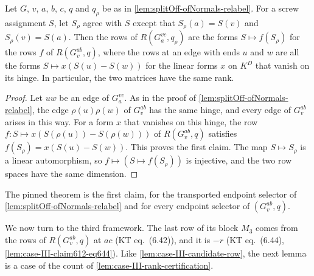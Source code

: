 \begin{lemma}
  \label{lem:splitOff-rigidityRows-relabel}
  \leanok
  Let $G$, $v$, $a$, $b$, $c$, $q$ and $q_\rho$ be as in
  \cref{lem:splitOff-ofNormals-relabel}. For a screw assignment $S$, let
  $S_\rho$ agree with $S$ except that $S_\rho(a) = S(v)$ and
  $S_\rho(v) = S(a)$. Then the rows of $R(G_a^{vc}, q_\rho)$ are the
  forms $S \mapsto f(S_\rho)$ for the rows $f$ of $R(G_v^{ab}, q)$, where
  the rows at an edge with ends $u$ and $w$ are all the forms
  $S \mapsto x(S(u) - S(w))$ for the linear forms $x$ on $K^D$ that
  vanish on its hinge. In particular, the two matrices have the same
  rank.
\end{lemma}
\begin{proof}
  \leanok
  Let $uw$ be an edge of $G_a^{vc}$. As in the proof of
  \cref{lem:splitOff-ofNormals-relabel}, the edge $\rho(u)\rho(w)$ of
  $G_v^{ab}$ has the same hinge, and every
  edge of $G_v^{ab}$ arises in this way. For a form $x$ that vanishes on
  this hinge, the row $f \colon S \mapsto x(S(\rho(u)) - S(\rho(w)))$ of
  $R(G_v^{ab}, q)$ satisfies $f(S_\rho) = x(S(u) - S(w))$. This proves
  the first claim. The map $S \mapsto S_\rho$ is a linear automorphism,
  so $f \mapsto (S \mapsto f(S_\rho))$ is injective, and the two row
  spaces have the same dimension.
\end{proof}

\begin{fmlnote}
  The pinned theorem is the first claim, for the transported endpoint
  selector of \cref{lem:splitOff-ofNormals-relabel} and for every
  endpoint selector of $(G_v^{ab}, q)$.
\end{fmlnote}

We now turn to the third framework. The last row of its block $M_3$
comes from the rows of $R(G_v^{ab}, q)$ at $ac$ (KT eq.~(6.42)), and it
is $-r$ (KT eq.~(6.44), \cref{lem:case-III-claim612-eq644}). Like
\cref{lem:case-III-candidate-row}, the next lemma is a case of the count
of \cref{lem:case-III-rank-certification}.

